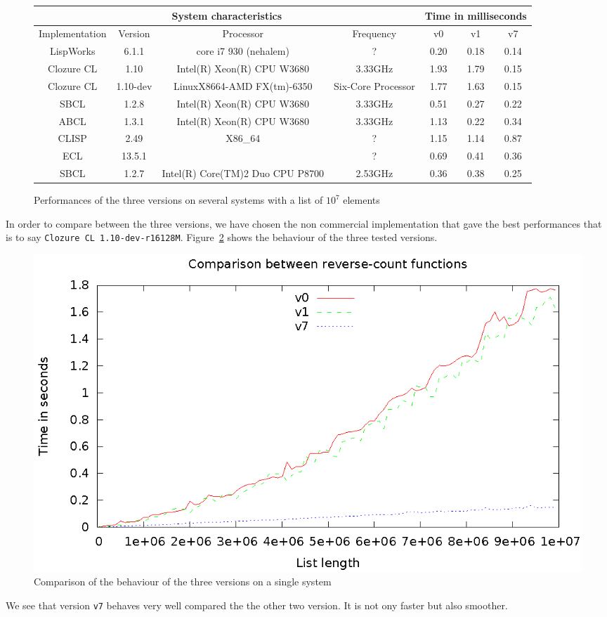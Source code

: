 \begin{figure}[htb]
\centering
\begin{tabular}{|c|c|c|c|c|c|c|}
\hline
\multicolumn{4}{|c|}{System characteristics}  & \multicolumn{3}{|c|}{Time in milliseconds}\\ \hline
Implementation & Version      & Processor                  & Frequency          & v0 & v1 & v7 \\ \hline
LispWorks  & 6.1.1            & core i7 930 (nehalem)      &  ?                 & 0.20 & 0.18 & 0.14 \\ \hline
Clozure CL & 1.10     & Intel(R) Xeon(R) CPU W3680 & 3.33GHz            & 1.93 & 1.79 & 0.15 \\ \hline
Clozure CL & 1.10-dev & LinuxX8664-AMD FX(tm)-6350 & Six-Core Processor & 1.77 & 1.63 & 0.15 \\ \hline
SBCL       & 1.2.8 & Intel(R) Xeon(R) CPU W3680 & 3.33GHz            & 0.51 & 0.27 & 0.22 \\ \hline
ABCL       & 1.3.1            & Intel(R) Xeon(R) CPU W3680 & 3.33GHz            & 1.13 & 0.22 & 0.34 \\ \hline
CLISP      & 2.49             & X86\_64                    &   ?                & 1.15 & 1.14 & 0.87 \\ \hline
ECL        & 13.5.1           &                            &   ?                & 0.69 & 0.41 & 0.36 \\ \hline
SBCL       & 1.2.7 & Intel(R) Core(TM)2 Duo CPU P8700 & 2.53GHz      & 0.36 & 0.38 & 0.25 \\ \hline
\end{tabular}
\caption{\label{f-systems} Performances of the three versions on several systems with a list of $10^7$ elements}
\end{figure}

In order to compare between the three versions, we have chosen the non commercial implementation
that gave the best performances that is to say \texttt{Clozure CL 1.10-dev-r16128M}.
Figure~\ref{f-versions} shows the behaviour of the three tested versions.

\begin{figure}[htb]
\centering
\includegraphics{v0-v1-v7.eps}
\caption{\label{f-versions} Comparison of the behaviour of the three versions on a single system}
\end{figure}

We see that version \texttt{v7} behaves very well compared the the other two version.
It is not ony faster but also smoother.

